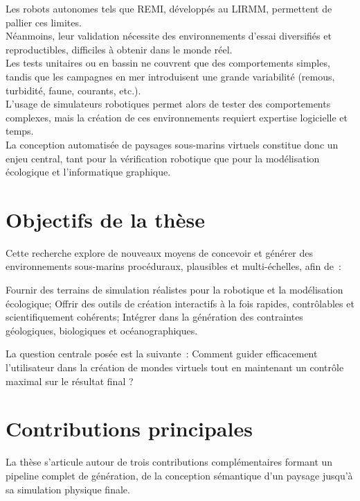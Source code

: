 Les robots autonomes tels que REMI, développés au LIRMM, permettent de pallier ces limites. \\
Néanmoins, leur validation nécessite des environnements d'essai diversifiés et reproductibles, difficiles à obtenir dans le monde réel. \\
Les tests unitaires ou en bassin ne couvrent que des comportements simples, tandis que les campagnes en mer introduisent une grande variabilité (remous, turbidité, faune, courants, etc.). \\
L'usage de simulateurs robotiques permet alors de tester des comportements complexes, mais la création de ces environnements requiert expertise logicielle et temps. \\
La conception automatisée de paysages sous-marins virtuels constitue donc un enjeu central, tant pour la vérification robotique que pour la modélisation écologique et l'informatique graphique.

\section*{Objectifs de la thèse}
Cette recherche explore de nouveaux moyens de concevoir et générer des environnements sous-marins procéduraux, plausibles et multi-échelles, afin de~:
\begin{Itemize}
    \Item{} Fournir des terrains de simulation réalistes pour la robotique et la modélisation écologique;
    \Item{} Offrir des outils de création interactifs à la fois rapides, contrôlables et scientifiquement cohérents;
    \Item{} Intégrer dans la génération des contraintes géologiques, biologiques et océanographiques. \\
\end{Itemize}

La question centrale posée est la suivante~:
Comment guider efficacement l'utilisateur dans la création de mondes virtuels tout en maintenant un contrôle maximal sur le résultat final ?

\section*{Contributions principales}
La thèse s'articule autour de trois contributions complémentaires formant un pipeline complet de génération, de la conception sémantique d'un paysage jusqu'à sa simulation physique finale. \\


